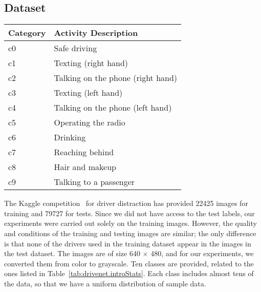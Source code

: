 \subsection{Dataset}
\begin{multicols}{2}
    \vspace{24pt}%

    {\singlespacing%
    \begin{tabular}{ll}
        \hline
        Category & Activity Description \\
        \hline
        c0 & Safe driving \\
        c1 & Texting (right hand) \\
        c2 & Talking on the phone (right hand) \\
        c3 & Texting (left hand) \\
        c4 & Talking on the phone (left hand) \\
        c5 & Operating the radio \\
        c6 & Drinking \\
        c7 & Reaching behind \\
        c8 & Hair and makeup \\
        c9 & Talking to a passenger \\
        \hline
    \end{tabular}
    }

\columnbreak%

    The Kaggle competition~\cite{montoya_State_2016} for driver distraction has provided 22425 images for training and 79727 for tests. Since we did not have access to the test labels, our experiments were carried out solely on the training images. However, the quality and conditions of the training and testing images are similar; the only difference is that none of the drivers used in the training dataset appear in the images in the test dataset. The images are of size 640 \ensuremath{\times} 480, and for our experiments, we converted them from color to grayscale. Ten classes are provided, related to the ones listed in Table~\ref{tab:drivenet.introStats}. Each class includes almost tens of the data, so that we have a uniform distribution of sample data.

\end{multicols}

